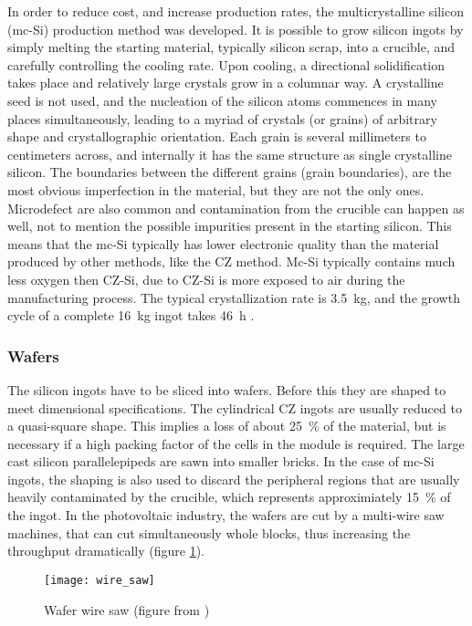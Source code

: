In order to reduce cost, and increase production rates, the multicrystalline silicon (mc-Si) production method was developed. It is possible to grow silicon ingots by simply melting the starting material, typically silicon scrap, into a crucible, and carefully controlling the cooling rate. Upon cooling, a directional solidification takes place and relatively large crystals grow in a columnar way. A crystalline seed is not used, and the nucleation of the silicon atoms commences in many places simultaneously, leading to a myriad of crystals (or grains) of arbitrary shape and crystallographic orientation. Each grain is several millimeters to centimeters across, and internally it has the same structure as single crystalline silicon. The boundaries between the different grains (grain boundaries), are the most obvious imperfection in the material, but they are not the only ones. Microdefect are also common and contamination from the crucible can happen as well, not to mention the possible impurities present in the starting silicon. This means that the mc-Si typically has lower electronic quality than the material produced by other methods, like the CZ method. Mc-Si typically contains much less oxygen then CZ-Si, due to CZ-Si is more exposed to air during the manufacturing process. The typical crystallization rate is 3.5~kg, and the growth cycle of a complete 16~kg ingot takes 46~h \cite{solar_cells}. 

\subsubsection{Wafers}

The silicon ingots have to be sliced into wafers. Before this they are shaped to meet dimensional specifications. The cylindrical CZ ingots are usually reduced to a quasi-square shape. This implies a loss of about 25~\% of the material, but is necessary if a high packing factor of the cells in the module is required. The large cast silicon parallelepipeds are sawn into smaller bricks. In the case of mc-Si ingots, the shaping is also used to discard the peripheral regions that are usually heavily contaminated by the crucible, which represents approximiately 15~\% of the ingot. In the photovoltaic industry, the wafers are cut by a multi-wire saw machines, that can cut simultaneously whole blocks, thus increasing the throughput dramatically (figure \ref{fig:wire_saw}).

\begin{figure}%
\texttt{[image: wire\_saw]}%
\caption{Wafer wire saw (figure from \cite{wire_saw})}%
\label{fig:wire_saw}%
\end{figure}


